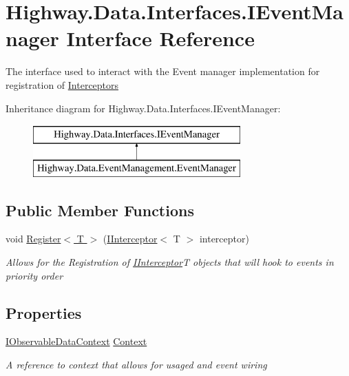 \hypertarget{interface_highway_1_1_data_1_1_interfaces_1_1_i_event_manager}{\section{Highway.\-Data.\-Interfaces.\-I\-Event\-Manager Interface Reference}
\label{interface_highway_1_1_data_1_1_interfaces_1_1_i_event_manager}
}


The interface used to interact with the Event manager implementation for registration of \hyperlink{namespace_highway_1_1_data_1_1_interceptors}{Interceptors}  


Inheritance diagram for Highway.\-Data.\-Interfaces.\-I\-Event\-Manager\-:\begin{figure}[H]
\begin{center}
\leavevmode
\includegraphics[height=2.000000cm]{interface_highway_1_1_data_1_1_interfaces_1_1_i_event_manager}
\end{center}
\end{figure}
\subsection*{Public Member Functions}
\begin{DoxyCompactItemize}
\item 
void \hyperlink{interface_highway_1_1_data_1_1_interfaces_1_1_i_event_manager_a5573595e903c9d9831145aaca1b24fa7}{Register$<$ T $>$} (\hyperlink{interface_highway_1_1_data_1_1_interfaces_1_1_i_interceptor-g}{I\-Interceptor}$<$ T $>$ interceptor)
\begin{DoxyCompactList}\small\item\em Allows for the Registration of \hyperlink{interface_highway_1_1_data_1_1_interfaces_1_1_i_interceptor-g}{I\-Interceptor}{\itshape T}  objects that will hook to events in priority order \end{DoxyCompactList}\end{DoxyCompactItemize}
\subsection*{Properties}
\begin{DoxyCompactItemize}
\item 
\hyperlink{interface_highway_1_1_data_1_1_interfaces_1_1_i_observable_data_context}{I\-Observable\-Data\-Context} \hyperlink{interface_highway_1_1_data_1_1_interfaces_1_1_i_event_manager_aae163759719833dca07513b02efbafa8}{Context}
\begin{DoxyCompactList}\small\item\em A reference to context that allows for usaged and event wiring \end{DoxyCompactList}\end{DoxyCompactItemize}


